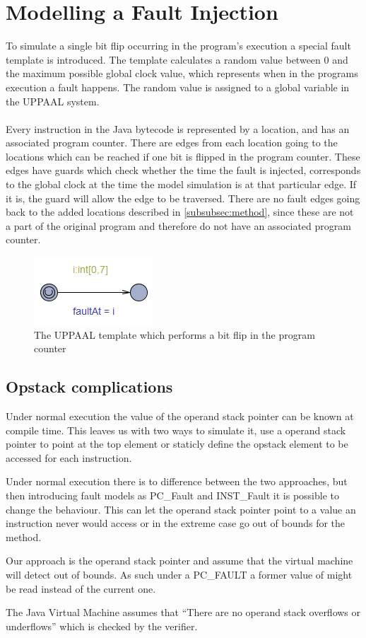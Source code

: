 \section{Modelling a Fault Injection}
To simulate a single bit flip occurring in the program's execution a special fault template is introduced. The template calculates a random value between $0$ and the maximum possible global clock value, which represents when in the programs execution a fault happens. The random value is assigned to a global variable in the UPPAAL system.\\\\
Every instruction in the Java bytecode is represented by a location, and has an associated program counter. There are edges from each location going to the locations which can be reached if one bit is flipped in the program counter. These edges have guards which check whether the time the fault is injected, corresponds to the global clock at the time the model simulation is at that particular edge. If it is, the guard will allow the edge to be traversed. There are no fault edges going back to the added locations described in \cref{subsubsec:method}, since these are not a part of the original program and therefore do not have an associated program counter.
\begin{figure}[H]
\centering
\includegraphics{figures/fault.PNG}
\caption{The UPPAAL template which performs a bit flip in the program counter}
\end{figure}


\subsection{Opstack complications}
Under normal execution the value of the operand stack pointer can be known at compile  time. This leaves us with two ways to simulate it, use a operand stack pointer to point at the top element or staticly define the opstack element to be accessed for each instruction.

Under normal execution there is to difference between the two approaches, but then introducing fault models as PC\_Fault and INST\_Fault it is possible to change the behaviour. This can let the operand stack pointer point to a value an instruction never would access or in the extreme case go out of bounds for the method.

Our approach is the operand stack pointer and assume that the virtual machine will detect out of bounds. As such under a PC\_FAULT a former value of might be read instead of the current one.

The Java Virtual Machine assumes that ``There are no operand stack overflows or underflows'' \cite[c. 4.10]{java_spec} which is checked by the verifier.